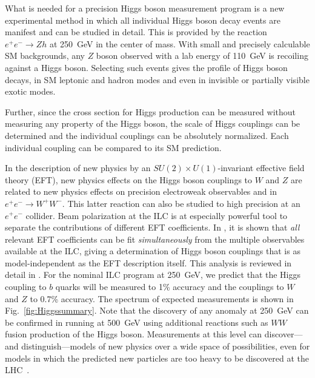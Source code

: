 \documentclass[%
 reprint,
 amsmath,amssymb,
 aps,
]{revtex4-1}
\def\ee{e^+e^-}
\begin{document}
What is needed for a precision Higgs boson measurement program
is a new experimental method in which all individual Higgs boson decay events
are manifest
and can be studied in detail.   This is provided by the reaction
$\ee\to Zh$ at 250~GeV in the center of mass.
  With small and precisely calculable SM backgrounds, any $Z$ boson
  observed with a lab energy of 110~GeV is recoiling against a Higgs
  boson.   Selecting such events gives the profile of Higgs boson
  decays, in SM leptonic and hadron modes and even in invisible or
  partially visible exotic modes. 

Further, since the cross section for Higgs production can be measured
without measuring any property of the Higgs boson, the scale of Higgs
couplings can be determined and the individual couplings can be
absolutely normalized.  Each individual coupling can be compared to
its SM prediction.

In the description of new physics by an  $SU(2)\times U(1)$-invariant
effective field theory (EFT), new physics effects on the  Higgs boson
couplings to $W$ and $Z$ are related to new physics effects on
precision electroweak observables and in $\ee\to W^+W^-$.   This
latter reaction can also be studied to high precision at an $\ee$
collider.  Beam polarization at the ILC is at especially powerful tool
to separate the contributions of different EFT
coefficients.    In \cite{Barklow:2017suo}, it is shown that {\it all}
relevant EFT
coefficients can be fit {\it simultaneously} from the multiple
observables available at the ILC, giving a 
determination of Higgs boson couplings that is as
model-independent as the EFT description itself. 
 This analysis is reviewed in detail in
\cite{ILCforESS}. 
For the nominal ILC program at 250~GeV, we predict that the Higgs
coupling to $b$ quarks will be measured to 1\% accuracy and the
couplings to $W$ and $Z$ to 0.7\% accuracy.  The spectrum of  expected
measurements is shown in Fig.~\ref{fig:Higgssummary}.  Note that the 
discovery of any anomaly at 250~GeV can be confirmed in running at
500~GeV 
using additional reactions  such as $WW$ fusion production of the
Higgs boson.   Measurements at this
level can discover---and distinguish---models of new physics over a
wide space of possibilities, even for models in which the predicted new
particles are too heavy to be discovered at the LHC~\cite{Barklow:2017suo}.
\end{document}
